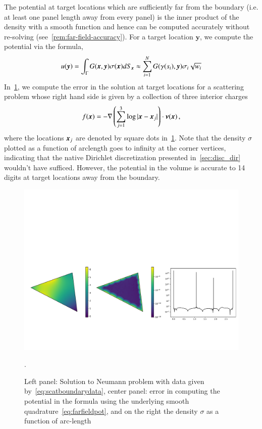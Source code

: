 The potential at target locations which are sufficiently far from the boundary (i.e. at least one panel length away from 
every panel) is the inner product of the 
density with a smooth function and hence can be computed accurately without re-solving (see~\cref{rem:far-field-accuracy}). For a target 
location $\boldsymbol{y}$, we compute the potential via the formula,
\begin{equation}
\label{eq:farfieldpot}
u(\boldsymbol{y}) = \int_{\Gamma} G(\boldsymbol{x},\boldsymbol{y}) \sigma(\boldsymbol{x}) dS_{\boldsymbol{x}} \approx \sum_{i=1}^{N}  G(\gamma(s_{i}),\boldsymbol{y}) \sigma_{i} \sqrt{w_{i}}
\end{equation}
In~\cref{fig:scatteringtest}, we compute the error in the solution at target
locations for a scattering problem whose right hand side is given by a collection of three interior charges
\begin{equation}
\label{eq:scatboundarydata}
f(\boldsymbol{x}) = -\nabla  \left(\sum_{j=1}^{3} \log |\boldsymbol{x} - \boldsymbol{x}_{j}|  \right)  \cdot \boldsymbol{\nu}(\boldsymbol{x})\, ,  
\end{equation}
where the locations $\boldsymbol{x}_{j}$ are denoted by square dots in~\cref{fig:scatteringtest}. Note that the density $\sigma$ plotted
as a function of arclength goes to infinity at the corner vertices, indicating that the native Dirichlet discretization 
presented in~\cref{sec:disc_dir} wouldn't have sufficed. However, the potential in the volume is accurate to 14 digits at
target locations away from the boundary. 
\begin{figure}
\begin{center}
\includegraphics[width=\linewidth]{paper-figs/weaktest}
\caption{Left panel: Solution to Neumann problem with data given by~\cref{eq:scatboundarydata}, center panel: error in computing the potential in the formula using the underlying smooth quadrature~\cref{eq:farfieldpot}, and on the right the density $\sigma$ as a function of arc-length}.
\label{fig:scatteringtest}
\end{center}
\end{figure}


